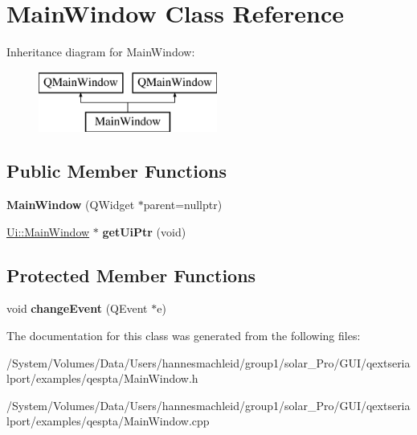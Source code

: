 \hypertarget{class_main_window}{}\section{Main\+Window Class Reference}
\label{class_main_window}
Inheritance diagram for Main\+Window\+:\begin{figure}[H]
\begin{center}
\leavevmode
\includegraphics[height=2.000000cm]{class_main_window}
\end{center}
\end{figure}
\subsection*{Public Member Functions}
\begin{DoxyCompactItemize}
\item 
\mbox{\label{class_main_window_ac3df08a4bc0438931d73601110c9267e}} 
{\bfseries Main\+Window} (Q\+Widget $\ast$parent=nullptr)
\item 
\mbox{\label{class_main_window_af2e643f312a31167e4134880d57c2e4e}} 
\mbox{\hyperlink{class_ui_1_1_main_window}{Ui\+::\+Main\+Window}} $\ast$ {\bfseries get\+Ui\+Ptr} (void)
\end{DoxyCompactItemize}
\subsection*{Protected Member Functions}
\begin{DoxyCompactItemize}
\item 
\mbox{\label{class_main_window_a35d3587c7aec05ebd82542643f2f67f9}} 
void {\bfseries change\+Event} (Q\+Event $\ast$e)
\end{DoxyCompactItemize}


The documentation for this class was generated from the following files\+:\begin{DoxyCompactItemize}
\item 
/\+System/\+Volumes/\+Data/\+Users/hannesmachleid/group1/solar\+\_\+\+Pro/\+G\+U\+I/qextserialport/examples/qespta/Main\+Window.\+h\item 
/\+System/\+Volumes/\+Data/\+Users/hannesmachleid/group1/solar\+\_\+\+Pro/\+G\+U\+I/qextserialport/examples/qespta/Main\+Window.\+cpp\end{DoxyCompactItemize}
